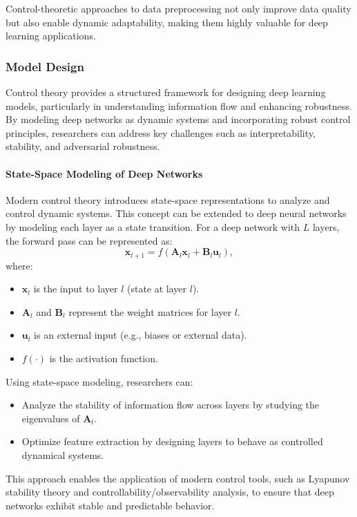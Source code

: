 \documentclass{IEEEojcsys}
\begin{document}
Control-theoretic approaches to data preprocessing not only improve data quality but also enable dynamic adaptability, making them highly valuable for deep learning applications.

\subsubsection{Model Design}
Control theory provides a structured framework for designing deep learning models, particularly in understanding information flow and enhancing robustness. By modeling deep networks as dynamic systems and incorporating robust control principles, researchers can address key challenges such as interpretability, stability, and adversarial robustness.

\paragraph{State-Space Modeling of Deep Networks}
Modern control theory introduces state-space representations to analyze and control dynamic systems. This concept can be extended to deep neural networks by modeling each layer as a state transition. For a deep network with $L$ layers, the forward pass can be represented as:
\[
\mathbf{x}_{l+1} = f(\mathbf{A}_l \mathbf{x}_l + \mathbf{B}_l \mathbf{u}_l),
\]
where:
\begin{itemize}
    \item $\mathbf{x}_l$ is the input to layer $l$ (state at layer $l$).
    \item $\mathbf{A}_l$ and $\mathbf{B}_l$ represent the weight matrices for layer $l$.
    \item $\mathbf{u}_l$ is an external input (e.g., biases or external data).
    \item $f(\cdot)$ is the activation function.
\end{itemize}

Using state-space modeling, researchers can:
\begin{itemize}
    \item Analyze the stability of information flow across layers by studying the eigenvalues of $\mathbf{A}_l$.
    \item Optimize feature extraction by designing layers to behave as controlled dynamical systems.
\end{itemize}

This approach enables the application of modern control tools, such as Lyapunov stability theory and controllability/observability analysis, to ensure that deep networks exhibit stable and predictable behavior.
\end{document}
